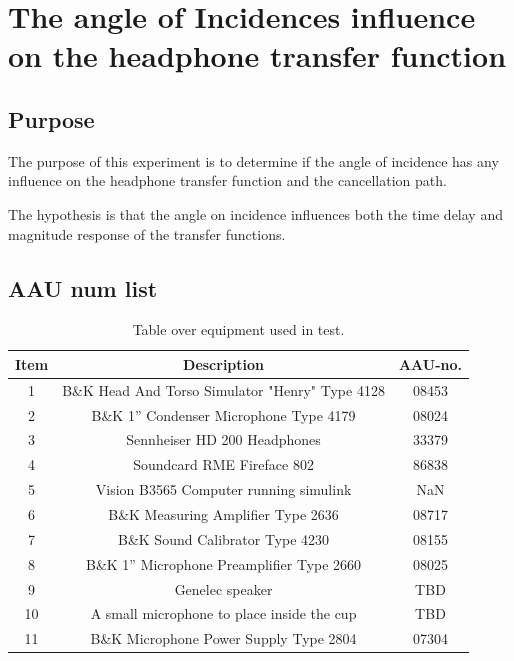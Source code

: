 
\section{The angle of Incidences influence on the headphone transfer function}

\subsection{Purpose}
The purpose of this experiment is to determine if the angle of incidence has any influence on the headphone transfer function and the cancellation path. 

The hypothesis is that the angle on incidence influences both the time delay and magnitude response of the transfer functions.

\subsection{AAU num list}
\begin{table}[H]
	\centering
	\begin{tabular}{ c c c } \toprule
		{Item}	& {Description} 						& {AAU-no}. \\ \bottomrule 
		1	&	B\&K Head And Torso Simulator "Henry" Type 4128	& 08453		\\
		2	&	B\&K 1'' Condenser Microphone Type 4179 	& 08024\\
		3	&	Sennheiser HD 200	Headphones				& 33379		\\
		4	&	Soundcard RME Fireface 802					& 86838		\\
		5	&	Vision B3565 Computer running simulink		& NaN		\\
		6	&	B\&K Measuring Amplifier Type 2636			& 08717		\\
		7	&	B\&K Sound Calibrator Type 4230				& 08155		\\ 
		8	&	B\&K 1'' Microphone Preamplifier Type 2660	& 08025		\\
		9	&	Genelec speaker								& TBD		\\ 
		10	&	A small microphone to place inside the cup	& TBD\\
		11	& 	B\&K Microphone Power Supply Type 2804		& 07304		\\
		\bottomrule
	\end{tabular}
	\caption{Table over equipment used in test.}
	\label{tab:AngleOfIncideceHP}
\end{table}

